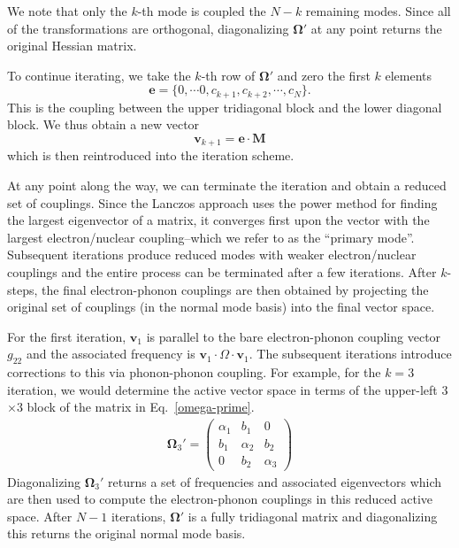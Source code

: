 We note that only the $k$-th mode is coupled the $N-k$ remaining modes.
Since all of the transformations are orthogonal, diagonalizing $\mathbf\Omega'$ at any point
returns the original Hessian matrix.

To continue iterating, we  take the $k$-th row of $\mathbf\Omega'$ and zero the first $k$ elements
$$
{\mathbf e} = \{0,\cdots 0,c_{k+1},c_{k+2},\cdots ,c_{N}\}.
$$
This is the coupling between the upper tridiagonal block and the lower diagonal block.
We thus obtain a new vector
$$
{\mathbf v}_{k+1} = {\mathbf e} \cdot {\mathbf M}
$$
which is then reintroduced into the iteration scheme.

At any point along the way, we can terminate the iteration and obtain a reduced set of
couplings.  Since the  Lanczos approach uses the power method for finding the largest eigenvector of a matrix,
it converges first upon the vector with the largest electron/nuclear coupling--which
 we refer to as the ``primary mode''.  Subsequent iterations produce reduced modes with
 weaker electron/nuclear couplings and the entire  process can be terminated after a few iterations.
After $k$-steps, the final electron-phonon couplings are then obtained by
projecting the original set of couplings (in the normal mode basis) into the final vector space.

For the first iteration, ${\mathbf v}_{1}$ is parallel to the bare electron-phonon coupling vector $g_{22}$
and the associated frequency is ${\mathbf v}_{1}\cdot\Omega\cdot{\mathbf v}_{1}$.   The subsequent iterations introduce
corrections to this via phonon-phonon coupling.  For example, for the $k=3$ iteration,
we would determine the active vector space in terms of the upper-left 3$\times 3$ block of the matrix in
Eq.~\ref{omega-prime}.
\begin{eqnarray}
{\mathbf \Omega}_{3}' =
\begin{pmatrix}
\alpha_{1}   & b_{1}    & 0      \\
b_{1}     & \alpha_{2}  & b_{2}                         \\
0            &   b_{2}         & \alpha_{3}
\end{pmatrix}
\end{eqnarray}
Diagonalizing  ${\mathbf \Omega}_{3}'$ returns a set of frequencies and  associated eigenvectors
which are then used to compute the electron-phonon couplings in this reduced active space.
After $N-1$ iterations, $\mathbf\Omega'$ is a fully tridiagonal matrix and diagonalizing this returns the original
normal mode basis.

